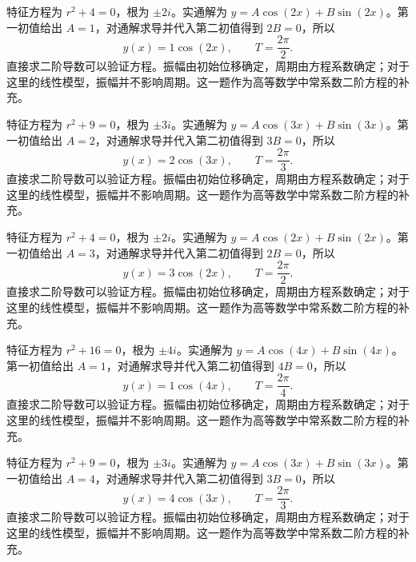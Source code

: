 \documentclass[12pt,fontset=fandol]{ctexart}
\begin{document}
\begin{solve}\label{ans:c22q20}
特征方程为 $r^2+4=0$，根为 $\pm 2i$。实通解为 $y=A\cos(2x)+B\sin(2x)$。第一初值给出 $A=1$，对通解求导并代入第二初值得到 $2B=0$，所以
\[
y(x)=1\cos(2x),\qquad T=\frac{2\pi}{2}.
\]
直接求二阶导数可以验证方程。振幅由初始位移确定，周期由方程系数确定；对于这里的线性模型，振幅并不影响周期。这一题作为高等数学中常系数二阶方程的补充。
\end{solve}

\begin{solve}\label{ans:c22q21}
特征方程为 $r^2+9=0$，根为 $\pm 3i$。实通解为 $y=A\cos(3x)+B\sin(3x)$。第一初值给出 $A=2$，对通解求导并代入第二初值得到 $3B=0$，所以
\[
y(x)=2\cos(3x),\qquad T=\frac{2\pi}{3}.
\]
直接求二阶导数可以验证方程。振幅由初始位移确定，周期由方程系数确定；对于这里的线性模型，振幅并不影响周期。这一题作为高等数学中常系数二阶方程的补充。
\end{solve}

\begin{solve}\label{ans:c22q22}
特征方程为 $r^2+4=0$，根为 $\pm 2i$。实通解为 $y=A\cos(2x)+B\sin(2x)$。第一初值给出 $A=3$，对通解求导并代入第二初值得到 $2B=0$，所以
\[
y(x)=3\cos(2x),\qquad T=\frac{2\pi}{2}.
\]
直接求二阶导数可以验证方程。振幅由初始位移确定，周期由方程系数确定；对于这里的线性模型，振幅并不影响周期。这一题作为高等数学中常系数二阶方程的补充。
\end{solve}

\begin{solve}\label{ans:c22q23}
特征方程为 $r^2+16=0$，根为 $\pm 4i$。实通解为 $y=A\cos(4x)+B\sin(4x)$。第一初值给出 $A=1$，对通解求导并代入第二初值得到 $4B=0$，所以
\[
y(x)=1\cos(4x),\qquad T=\frac{2\pi}{4}.
\]
直接求二阶导数可以验证方程。振幅由初始位移确定，周期由方程系数确定；对于这里的线性模型，振幅并不影响周期。这一题作为高等数学中常系数二阶方程的补充。
\end{solve}

\begin{solve}\label{ans:c22q24}
特征方程为 $r^2+9=0$，根为 $\pm 3i$。实通解为 $y=A\cos(3x)+B\sin(3x)$。第一初值给出 $A=4$，对通解求导并代入第二初值得到 $3B=0$，所以
\[
y(x)=4\cos(3x),\qquad T=\frac{2\pi}{3}.
\]
直接求二阶导数可以验证方程。振幅由初始位移确定，周期由方程系数确定；对于这里的线性模型，振幅并不影响周期。这一题作为高等数学中常系数二阶方程的补充。
\end{solve}
\end{document}
